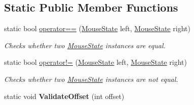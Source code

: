 \subsection*{Static Public Member Functions}
\begin{DoxyCompactItemize}
\item 
static bool \hyperlink{struct_open_t_k_1_1_input_1_1_mouse_state_a94be18bd8dba5aa84dea4b464de7ff60}{operator==} (\hyperlink{struct_open_t_k_1_1_input_1_1_mouse_state}{Mouse\-State} left, \hyperlink{struct_open_t_k_1_1_input_1_1_mouse_state}{Mouse\-State} right)
\begin{DoxyCompactList}\small\item\em Checks whether two \hyperlink{struct_open_t_k_1_1_input_1_1_mouse_state}{Mouse\-State} instances are equal. \end{DoxyCompactList}\item 
static bool \hyperlink{struct_open_t_k_1_1_input_1_1_mouse_state_a5b845f3fb3507403f2270a0f8b587b26}{operator!=} (\hyperlink{struct_open_t_k_1_1_input_1_1_mouse_state}{Mouse\-State} left, \hyperlink{struct_open_t_k_1_1_input_1_1_mouse_state}{Mouse\-State} right)
\begin{DoxyCompactList}\small\item\em Checks whether two \hyperlink{struct_open_t_k_1_1_input_1_1_mouse_state}{Mouse\-State} instances are not equal. \end{DoxyCompactList}\item 
\hypertarget{struct_open_t_k_1_1_input_1_1_mouse_state_ae51d55198f3350ab9faa26138c446c38}{static void {\bfseries Validate\-Offset} (int offset)}\label{struct_open_t_k_1_1_input_1_1_mouse_state_ae51d55198f3350ab9faa26138c446c38}

\end{DoxyCompactItemize}
